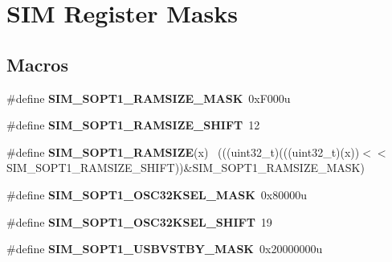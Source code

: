 \hypertarget{group___s_i_m___register___masks}{}\section{S\+I\+M Register Masks}
\label{group___s_i_m___register___masks}
\subsection*{Macros}
\begin{DoxyCompactItemize}
\item 
\hypertarget{group___s_i_m___register___masks_ga9fbcfd0b3e4fb08ee733dee975a5df29}{}\#define {\bfseries S\+I\+M\+\_\+\+S\+O\+P\+T1\+\_\+\+R\+A\+M\+S\+I\+Z\+E\+\_\+\+M\+A\+S\+K}~0x\+F000u\label{group___s_i_m___register___masks_ga9fbcfd0b3e4fb08ee733dee975a5df29}

\item 
\hypertarget{group___s_i_m___register___masks_ga4100f9e8e8ffc766ac1ac6493379b8dc}{}\#define {\bfseries S\+I\+M\+\_\+\+S\+O\+P\+T1\+\_\+\+R\+A\+M\+S\+I\+Z\+E\+\_\+\+S\+H\+I\+F\+T}~12\label{group___s_i_m___register___masks_ga4100f9e8e8ffc766ac1ac6493379b8dc}

\item 
\hypertarget{group___s_i_m___register___masks_gaf9b9b3caaa8087f8530f5c2d1418e7b0}{}\#define {\bfseries S\+I\+M\+\_\+\+S\+O\+P\+T1\+\_\+\+R\+A\+M\+S\+I\+Z\+E}(x)                                      ~(((uint32\+\_\+t)(((uint32\+\_\+t)(x))$<$$<$S\+I\+M\+\_\+\+S\+O\+P\+T1\+\_\+\+R\+A\+M\+S\+I\+Z\+E\+\_\+\+S\+H\+I\+F\+T))\&S\+I\+M\+\_\+\+S\+O\+P\+T1\+\_\+\+R\+A\+M\+S\+I\+Z\+E\+\_\+\+M\+A\+S\+K)\label{group___s_i_m___register___masks_gaf9b9b3caaa8087f8530f5c2d1418e7b0}

\item 
\hypertarget{group___s_i_m___register___masks_ga5c660cd4a6d8062e6ef4afbc17c27fa4}{}\#define {\bfseries S\+I\+M\+\_\+\+S\+O\+P\+T1\+\_\+\+O\+S\+C32\+K\+S\+E\+L\+\_\+\+M\+A\+S\+K}~0x80000u\label{group___s_i_m___register___masks_ga5c660cd4a6d8062e6ef4afbc17c27fa4}

\item 
\hypertarget{group___s_i_m___register___masks_gac9e930c4ee375a2aee6fa6c97e061226}{}\#define {\bfseries S\+I\+M\+\_\+\+S\+O\+P\+T1\+\_\+\+O\+S\+C32\+K\+S\+E\+L\+\_\+\+S\+H\+I\+F\+T}~19\label{group___s_i_m___register___masks_gac9e930c4ee375a2aee6fa6c97e061226}

\item 
\hypertarget{group___s_i_m___register___masks_gaaf0b406e4bd1800083f48727a7cde829}{}\#define {\bfseries S\+I\+M\+\_\+\+S\+O\+P\+T1\+\_\+\+U\+S\+B\+V\+S\+T\+B\+Y\+\_\+\+M\+A\+S\+K}~0x20000000u\label{group___s_i_m___register___masks_gaaf0b406e4bd1800083f48727a7cde829}


\end{DoxyCompactItemize}

